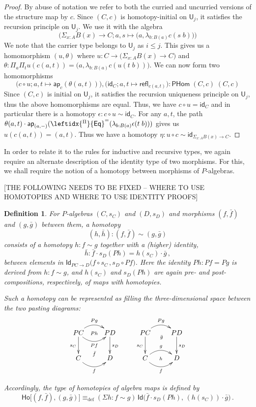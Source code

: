 \documentclass[reqno,10pt,a4paper,oneside]{amsart}
\numberwithin{equation}{section}
\theoremstyle{mythm}
\theoremstyle{mydef}
\newtheorem{definition}[theorem]{Definition}
\theoremstyle{myrmk}
\newcommand{\deq}{\equiv}
\newcommand{\defeq}{\deq_{\mathrm{def}}}
\newcommand{\idfun}[1]{\mathsf{id}_{#1}}
\newcommand{\comp}{\circ}
\newcommand{\ct}{\cdot}
\newcommand{\funext}{\leftidx{^\Pi}{\mathsf{Eq}}^{=}}
\newcommand{\prd}[1]{\Pi_{#1}}
\newcommand{\sm}[1]{\Sigma_{#1}}
\newcommand{\lam}[1]{\lambda_{#1}}
\newcommand{\app}{\mathsf{ap}}
\newcommand{\Id}{\mathsf{Id}}
\newcommand{\id}[1]{\Id_{#1}}
\newcommand{\refl}{\mathsf{refl}}
\newcommand{\UU}{\mathsf{U}}
\newcommand{\Ho}{\mathsf{Ho}}
\newcommand{\WHom}{\mathsf{PHom}}
\begin{document}
\begin{proof}
By abuse of notation we refer to both the curried and uncurried versions of the structure map by $c$. Since $(C,c)$ is homotopy-initial on $\UU_j$, it satisfies the recursion principle on $\UU_j$. We use it with the algebra \[\Big(\sm{x:A} B(x) \to C; a,s \mapsto \big(a,\lam{b:B(a)} c(s\;b)\big)\Big)\]
We note that the carrier type belongs to $\UU_j$ as $i \leq j$. This gives us a homomorphism $(u,\theta)$ where $u : C \to \big(\sm{x:A} B(x) \to C\big)$ and $\theta : \prd{a}\prd{t} u(c(a,t)) = \big(a,\lam{b:B(a)} c(u(t\;b))\big)$.  We can now form two homomorphisms
\[\big(c \comp u; a,t \mapsto \app_c(\theta(a,t))\big), \big(\idfun{C}; a,t \mapsto \refl_{c(a,t)}\big) : \WHom \; (C,c) \; (C,c)\]
Since $(C,c)$ is initial on $\UU_j$, it satisfies the recursion uniqueness principle on $\UU_j$, thus the above homomorphisms are equal. Thus, we have $c \comp u = \idfun{C}$ and in particular there is a homotopy $\epsilon : c \comp u \sim \idfun{C}$. For any $a,t$, the path $\theta(a,t) \ct \app_{(a,-)}(\funext(\lam{b:B(a)} \epsilon(t\;b)))$ gives us $u(c(a,t)) = (a,t)$. Thus we have a homotopy $\eta : u \comp c \sim \idfun{\sm{x:A} B(x) \to C}$.
\end{proof}



In order to relate it to the rules for inductive and recursive types, we again require an alternate description of the identity type of two morphisms. For this, we shall require the notion of a homotopy between morphisms of $P$-algebras. 

[THE FOLLOWING NEEDS TO BE FIXED -- WHERE TO USE HOMOTOPIES AND WHERE TO USE IDENTITY PROOFS]
\begin{definition}
For $P$-algebras $(C,s_C)$ and $(D,s_D)$ and morphisms $(f, \bar{f})$ and $(g, \bar{g})$ between them, a \emph{homotopy}  $$(h, \bar{h}) : (f, \bar{f}) \sim (g, \bar{g})$$
consists of a homotopy $h : f \sim g$ together with a (higher) identity, 
\[
\bar{h} : \bar{f} \cdot s_D(Ph) = h(s_C)\cdot \bar{g}\, ,
\]
between elements in $\id{PC \rightarrow D}\big( f \circ s_C \, ,  s_{D} \circ Pf \big)$.  Here the identity $Ph : Pf = Pg$ is derived from $h : f \sim g$, and $h(s_C)$ and $s_D(Ph)$ are again pre- and post-compositions, respectively, of maps with homotopies.

Such a homotopy can be represented as filling the three-dimensional space between the two pasting diagrams:
\[
\xymatrix{
PC \ar@/^1pc/[r]^{Pg}   \ar[d]_{s_C}   \ar@/_1pc/[r]_{Pf} \ar@{}[r]|{Ph}
& PD \ar[d]^{s_D}  \\
C  \ar@/_1pc/[r]_f  \ar@{}[r]^{\bar{f}} & D }
\qquad
\xymatrix{
PC \ar@/^1pc/[r]^{Pg}   \ar[d]_{s_C} \ar@{}[r]_(.52){\bar{g}}  & PD \ar[d]^{s_D}  \\
C \ar@/^1pc/[r]^g  \ar@/_1pc/[r]_f  \ar@{}[r]|{h} & D }
\]

Accordingly, the type of homotopies of algebra maps is defined by
\[
\Ho
\big[ (f,\bar{f}), (g, \bar{g})  \big]
 \defeq  
(\Sigma h:  f \sim g) \, \Id\big( \bar{f} \cdot s_D(Ph),\, (h(s_C))\cdot \bar{g} \big) \, .
\]
\end{definition}
\end{document}
